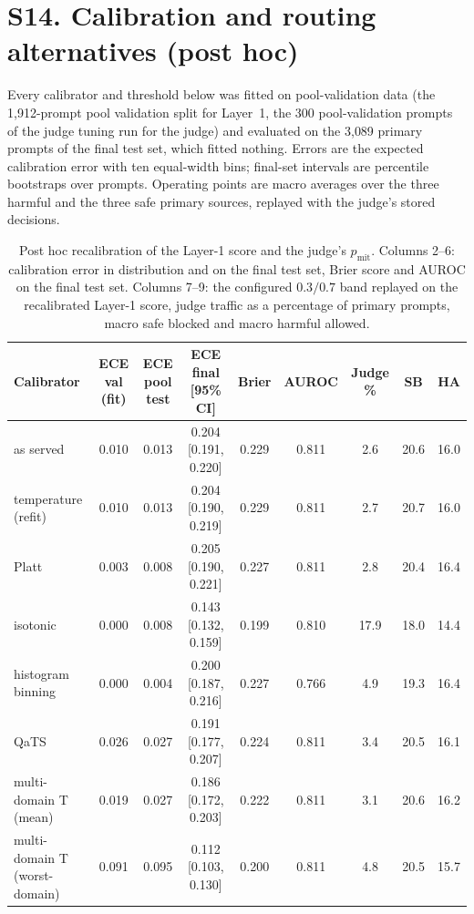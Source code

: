 \section*{S14. Calibration and routing alternatives (post hoc)}

Every calibrator and threshold below was fitted on pool-validation data (the 1{,}912-prompt pool validation split for Layer~1, the 300 pool-validation prompts of the judge tuning run for the judge) and evaluated on the 3{,}089 primary prompts of the final test set, which fitted nothing. Errors are the expected calibration error with ten equal-width bins; final-set intervals are percentile bootstraps over prompts. Operating points are macro averages over the three harmful and the three safe primary sources, replayed with the judge's stored decisions.

\begin{table}[!htbp]
\caption{Post hoc recalibration of the Layer-1 score and the judge's $p_{\mathrm{mit}}$. Columns 2--6: calibration error in distribution and on the final test set, Brier score and AUROC on the final test set. Columns 7--9: the configured $0.3/0.7$ band replayed on the recalibrated Layer-1 score, judge traffic as a percentage of primary prompts, macro safe blocked and macro harmful allowed.}
\label{tab:calibalt}
\centering
\scriptsize
\setlength{\tabcolsep}{3pt}
\begin{tabular}{@{}lccccc ccc@{}}
\toprule
Calibrator & ECE val (fit) & ECE pool test & ECE final [95\% CI] & Brier & AUROC & Judge \% & SB & HA \\
\midrule
as served & 0.010 & 0.013 & 0.204 [0.191, 0.220] & 0.229 & 0.811 & 2.6 & 20.6 & 16.0 \\
temperature (refit) & 0.010 & 0.013 & 0.204 [0.190, 0.219] & 0.229 & 0.811 & 2.7 & 20.7 & 16.0 \\
Platt & 0.003 & 0.008 & 0.205 [0.190, 0.221] & 0.227 & 0.811 & 2.8 & 20.4 & 16.4 \\
isotonic & 0.000 & 0.008 & 0.143 [0.132, 0.159] & 0.199 & 0.810 & 17.9 & 18.0 & 14.4 \\
histogram binning & 0.000 & 0.004 & 0.200 [0.187, 0.216] & 0.227 & 0.766 & 4.9 & 19.3 & 16.4 \\
QaTS & 0.026 & 0.027 & 0.191 [0.177, 0.207] & 0.224 & 0.811 & 3.4 & 20.5 & 16.1 \\
multi-domain T (mean) & 0.019 & 0.027 & 0.186 [0.172, 0.203] & 0.222 & 0.811 & 3.1 & 20.6 & 16.2 \\
multi-domain T (worst-domain) & 0.091 & 0.095 & 0.112 [0.103, 0.130] & 0.200 & 0.811 & 4.8 & 20.5 & 15.7 \\

\end{tabular}
\end{table}
